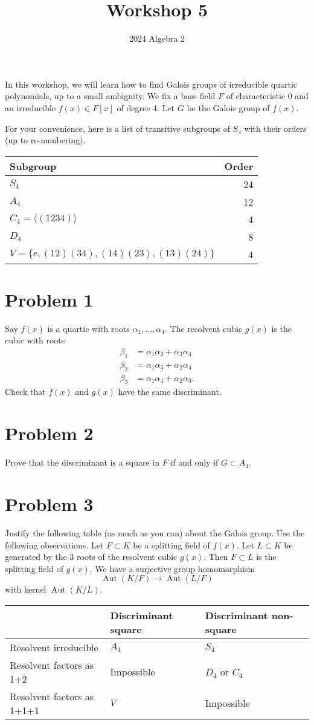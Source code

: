 \documentclass[12pt]{amsart}
\author{2024 Algebra 2}
\date{}
\title{Workshop 5}
\begin{document}
\maketitle
In this workshop, we will learn how to find Galois groups of irreducible quartic polynomials, up to a small ambiguity.
We fix a base field \(F\) of characteristic 0 and an irreducible \(f(x) \in F[x]\) of degree 4.
Let \(G\) be the Galois group of \(f(x)\).

For your convenience, here is a list of transitive subgroups of \(S_{4}\) with their orders (up to re-numbering).

\begin{center}
\begin{tabular}{lr}
Subgroup & Order\\
\hline
\(S_4\) & 24\\
\(A_4\) & 12\\
\(C_4 = \langle (1234) \rangle\) & 4\\
\(D_4\) & 8\\
\(V = \{e,(12)(34), (14)(23), (13)(24) \}\) & 4\\
\hline
\end{tabular}
\end{center}
\section{Problem 1}
\label{sec:orgc11a661}

Say \(f(x)\) is a quartic with roots \(\alpha_1, \dots, \alpha_4\).
The resolvent cubic \(g(x)\) is the cubic with roots 
\begin{align*}
\beta_1 &= \alpha_1\alpha_2 + \alpha_3\alpha_4\\
\beta_2 &= \alpha_1\alpha_3 + \alpha_2\alpha_4\\
\beta_3 &= \alpha_1\alpha_4 + \alpha_2\alpha_3.
\end{align*}
Check that \(f(x)\) and \(g(x)\) have the same discriminant.
\section{Problem 2}
\label{sec:org7e856fe}

Prove that the discriminant is a square in \(F\) if and only if \(G \subset A_4\).
\section{Problem 3}
\label{sec:org89b3e8f}

Justify the following table (as much as you can) about the Galois group.
Use the following observations.
Let \(F \subset K\) be a splitting field of \(f(x)\).
Let \(L \subset K\) be generated by the 3 roots of the resolvent cubic \(g(x)\).
Then \(F \subset L\) is the splitting field of \(g(x)\).
We have a surjective group homomorphism
\[ \operatorname{Aut}(K/F) \to \operatorname{Aut}(L/F)\]
with kernel \(\operatorname{Aut}(K/L)\).


\begin{center}
\begin{tabular}{lll}
 & Discriminant square & Discriminant non-square\\
\hline
Resolvent irreducible & \(A_4\) & \(S_4\)\\
Resolvent factors as 1+2 & Impossible & \(D_4\) or \(C_4\)\\
Resolvent factors as 1+1+1 & \(V\) & Impossible\\
\hline
\end{tabular}
\end{center}
\end{document}
